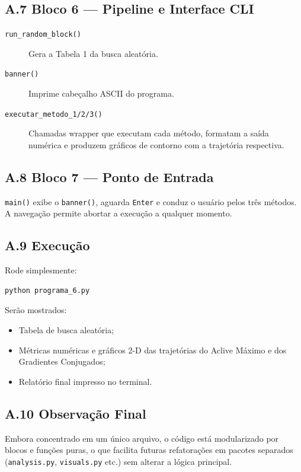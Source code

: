 \documentclass[12pt]{article}
\begin{document}
\subsection*{A.7 Bloco 6 — Pipeline e Interface CLI}
\begin{description}
  \item[\texttt{run\_random\_block()}] Gera a Tabela 1 da busca aleatória.
  \item[\texttt{banner()}] Imprime cabeçalho ASCII do programa.
  \item[\texttt{executar\_metodo\_1/2/3()}] Chamadas wrapper que executam cada
        método, formatam a saída numérica e produzem gráficos de contorno
        com a trajetória respectiva.
\end{description}

\subsection*{A.8 Bloco 7 — Ponto de Entrada}
\texttt{main()} exibe o \texttt{banner()}, aguarda \texttt{Enter} e conduz o
usuário pelos três métodos.  
A navegação permite abortar a execução a qualquer momento.

\subsection*{A.9 Execução}
Rode simplesmente:
\begin{verbatim}
python programa_6.py
\end{verbatim}
Serão mostrados:
\begin{itemize}
  \item Tabela de busca aleatória;
  \item Métricas numéricas e gráficos 2-D das trajetórias do Aclive Máximo
        e dos Gradientes Conjugados;
  \item Relatório final impresso no terminal.
\end{itemize}

\subsection*{A.10 Observação Final}
Embora concentrado em um único arquivo, o código está modularizado por blocos
e funções puras, o que facilita futuras refatorações em pacotes separados
(\texttt{analysis.py}, \texttt{visuals.py} etc.) sem alterar a lógica principal.
\end{document}

